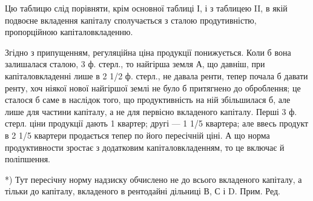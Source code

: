 Цю таблицю слід порівняти, крім основної таблиці І, і з таблицею II, в якій
подвоєне вкладення капіталу сполучається з сталою продутивністю, пропорційною
капіталовкладенню.

Згідно з припущенням, регуляційна ціна продукції понижується. Коли б
вона залишалася сталою, 3 ф. стерл., то найгірша земля А, що давніш, при
капіталовкладенні лише в 2 1/2 ф. стерл., не давала ренти, тепер почала б давати
ренту, хоч ніякої нової найгіршої землі не було б притягнено до оброблення;
це сталося б саме в наслідок того, що продуктивність на ній збільшилася б, але
лише для частини капіталу, а не для первісно вкладеного капіталу. Перші 3 ф.
стерл. ціни продукції дають 1 квартер; другі — 1 1/5 квартера; але ввесь продукт в
2 1/5 квартери продається тепер по його пересічній ціні. А що норма продуктивности
зростає з додатковим капіталовкладенням, то це включає й поліпшення.

*) Тут пересічну норму надзиску обчислено не до всього вкладеного капіталу, а тільки до капіталу,
вкладеного в рентодайні дільниці В, С і D. Прим. Ред.
\parbreak{}  %
